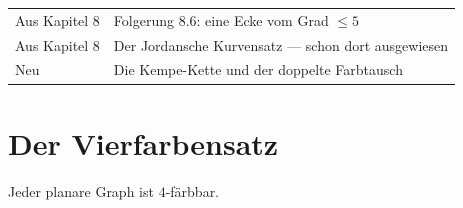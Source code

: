 \begin{merksatz}
\begin{center}
\renewcommand{\arraystretch}{1.5}
\begin{tabular}{@{}P{3.0cm}P{5.6cm}@{}}
\toprule
Aus Kapitel 8 & Folgerung 8.6: eine Ecke vom Grad $\le 5$\\
Aus Kapitel 8 & Der Jordansche Kurvensatz --- schon dort ausgewiesen\\
Neu & Die Kempe-Kette und der doppelte Farbtausch\\
\bottomrule
\end{tabular}
\end{center}

\begin{center}
\begin{minipage}{0.88\textwidth}
\end{minipage}
\end{center}
\end{merksatz}

\section{Der Vierfarbensatz}

\begin{merksatz}
Jeder planare Graph ist $4$-färbbar.
\end{merksatz}

